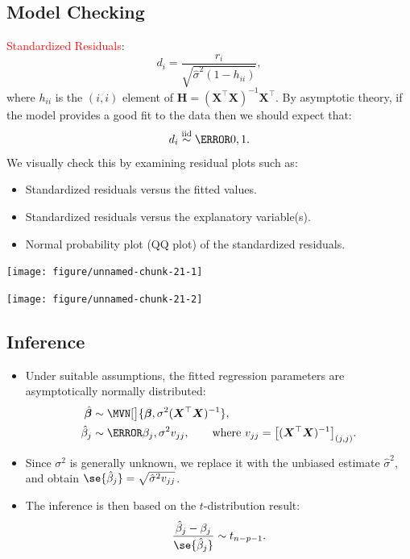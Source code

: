 \documentclass{article}\usepackage[]{graphicx}\usepackage[svgnames]{xcolor}
\newenvironment{knitrout}{}{} %
\newcommand*\circled[1]{\tikz[baseline=(char.base)]{\node[shape=circle,draw,inner sep=2pt] (char) {#1};}}
\newcommand{\iid}{\overset{\text{iid}}{\sim}}%
\providecommand{\Vector}[1]{\bm{#1}}%
\providecommand{\Matrix}[1]{\bm{#1}}
\begin{document}
\subsection*{\circled{3} Model Checking}
\textcolor{Red}{Standardized Residuals}:
\[ d_i=\frac{r_i}{\sqrt{\hat{\sigma}^2(1-h_{ii})}},  \]
where $ h_{ii} $ is the $ (i,i) $ element of $ \Matrix{H}=(\Matrix{X}^\top\Matrix{X})^{-1}\Matrix{X}^\top $.
By asymptotic theory, if the model provides a good fit to the data then we
should expect that:
\[ d_i\iid \N{0,1}. \]
We visually check this by examining residual plots such as:
\begin{itemize}
      \item Standardized residuals versus the fitted values.
      \item Standardized residuals versus the explanatory variable(s).
      \item Normal probability plot (QQ plot) of the standardized residuals.
\end{itemize}
\begin{knitrout}
\color{fgcolor}

{\centering \texttt{[image: figure/unnamed-chunk-21-1]} 

}




{\centering \texttt{[image: figure/unnamed-chunk-21-2]} 

}


\end{knitrout}

\subsection*{\circled{4} Inference}
\begin{itemize}
      \item Under suitable assumptions, the fitted regression parameters are asymptotically
            normally distributed:
            \begin{align*}
                  \hat{\Vector{\beta}} & \sim \MVN[\big]{\Vector{\beta},\sigma^2(\Matrix{X}^\top \Matrix{X})^{-1}},                                        \\
                  \hat{\beta}_j        & \sim \N{\beta_j,\sigma^2v_{jj}},\qquad\text{where $v_{jj}=\bigl[(\Matrix{X}^\top\Matrix{X})^{-1}\bigr]_{(j,j)}$}.
            \end{align*}
      \item Since $ \sigma^2 $ is generally unknown, we replace it with the unbiased estimate $ \hat{\sigma}^2 $, and obtain $ \se{\hat{\beta}_j}=\sqrt{\hat{\sigma}^2v_{jj}} $.
      \item The inference is then based on the $t$-distribution result:
            \[ \frac{\hat{\beta}_j-\beta_j}{\se{\hat{\beta}_j}}\sim t_{n-p-1}.  \]
\end{itemize}
\end{document}
